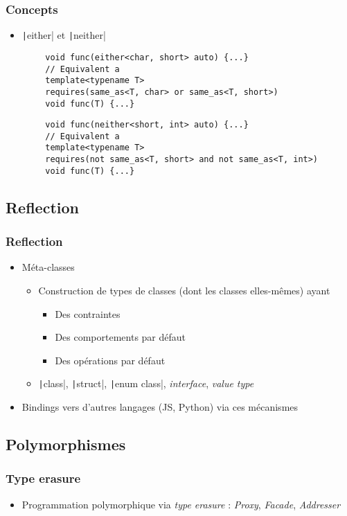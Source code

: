 \documentclass[C++.tex]{subfiles}
\begin{document}
\begin{frame}[fragile]
	\frametitle{Concepts}
	\begin{itemize}
		\item \texttt|either| et \texttt|neither|
	\end{itemize}

	\begin{verbatim}
		void func(either<char, short> auto) {...}
		// Equivalent a
		template<typename T>
		requires(same_as<T, char> or same_as<T, short>)
		void func(T) {...}
	\end{verbatim}

	\begin{verbatim}
		void func(neither<short, int> auto) {...}
		// Equivalent a
		template<typename T>
		requires(not same_as<T, short> and not same_as<T, int>)
		void func(T) {...}
	\end{verbatim}

\end{frame}

\subsection*{Reflection}
\begin{frame}[fragile]
	\frametitle{Reflection}
	\begin{itemize}
		\item Méta-classes
		\begin{itemize}
			\item Construction de types de classes (dont les classes elles-mêmes) ayant
			\begin{itemize}
				\item Des contraintes
				\item Des comportements par défaut
				\item Des opérations par défaut
			\end{itemize}
			\item \texttt|class|, \texttt|struct|, \texttt|enum class|, \textit{interface}, \textit{value type}
		\end{itemize}
		\item Bindings vers d'autres langages (JS, Python) via ces mécanismes
	\end{itemize}
\end{frame}

\subsection*{Polymorphismes}
\begin{frame}[fragile]
	\frametitle{Type erasure}
	\begin{itemize}
		\item Programmation polymorphique via \textit{type erasure} : \textit{Proxy}, \textit{Facade}, \textit{Addresser}

	\end{itemize}
\end{frame}
\end{document}
